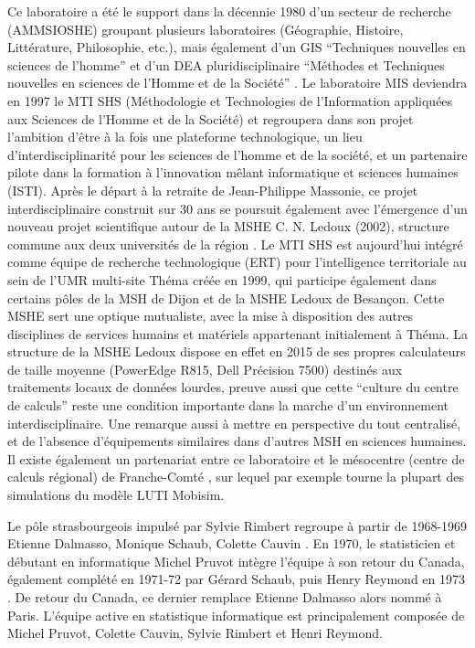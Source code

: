 Ce laboratoire a été le support dans la décennie 1980 d'un secteur de recherche (AMMSIOSHE) groupant plusieurs laboratoires (Géographie, Histoire, Littérature, Philosophie, etc.), mais également d'un GIS \enquote{Techniques nouvelles en sciences de l'homme} et d'un DEA pluridisciplinaire \enquote{Méthodes et Techniques nouvelles en sciences de l'Homme et de la Société} \autocite{TSH1984}. Le laboratoire MIS deviendra en 1997 le MTI SHS (Méthodologie et Technologies de l'Information appliquées aux Sciences de l'Homme et de la Société) \autocite{Girardot2004} et regroupera dans son projet l'ambition d'être à la fois une plateforme technologique, un lieu d'interdisciplinarité pour les sciences de l'homme et de la société, et un partenaire pilote dans la formation à l'innovation mêlant informatique et sciences humaines (ISTI). Après le départ à la retraite de Jean-Philippe Massonie, ce projet interdisciplinaire construit sur 30 ans se poursuit également avec l'émergence d'un nouveau projet scientifique autour de la MSHE C. N. Ledoux (2002), structure commune aux deux universités de la région \autocites{Favory2003, Favory2009}. Le MTI SHS est aujourd'hui intégré comme équipe de recherche technologique (ERT) pour l'intelligence territoriale au sein de l'UMR multi-site Théma créée en 1999, qui participe également dans certains pôles de la MSH de Dijon et de la MSHE Ledoux de Besançon. Cette MSHE sert une optique mutualiste, avec la mise à disposition des autres disciplines de services humains et matériels appartenant initialement à Théma. La structure de la MSHE Ledoux dispose en effet en 2015 de ses propres calculateurs de taille moyenne (PowerEdge R815, Dell Précision 7500) destinés aux traitements locaux de données lourdes, preuve aussi que cette \enquote{culture du centre de calculs} reste une condition importante dans la marche d'un environnement interdisciplinaire. Une remarque aussi à mettre en perspective du tout centralisé, et de l'absence d'équipements similaires dans d'autres MSH en sciences humaines. Il existe également un partenariat entre ce laboratoire et le mésocentre (centre de calculs régional) de Franche-Comté \autocite{Asch2012}, sur lequel par exemple tourne la plupart des simulations du modèle LUTI Mobisim.\autocites{Thema2010, Hirtzel2015}

Le pôle strasbourgeois impulsé par Sylvie Rimbert regroupe à partir de 1968-1969 Etienne Dalmasso, Monique Schaub, Colette Cauvin . En 1970, le statisticien et débutant en informatique Michel Pruvot intègre l'équipe à son retour du Canada, également complété en 1971-72 par Gérard Schaub, puis Henry Reymond en 1973 \autocite[135-153]{Cuyala2014}. De retour du Canada, ce dernier remplace Etienne Dalmasso alors nommé à Paris. L'équipe active en statistique informatique est principalement composée de Michel Pruvot, Colette Cauvin, Sylvie Rimbert et Henri Reymond. %

